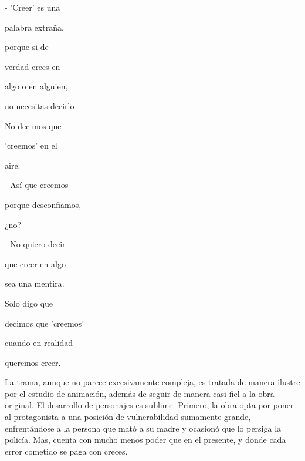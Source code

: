 \documentclass[A5paper, 11pt]{article}
\begin{document}
{\tiny{\hspace{-3.5cm}- 'Creer' es una

\hspace{-3.5cm} palabra extraña,

\hspace{-3.5cm} porque si de

\hspace{-3.5cm} verdad crees en

\hspace{-3.5cm }algo o en alguien,

\hspace{-3.5cm} no necesitas decirlo

\hspace{-3.5cm} No decimos que

\hspace{-3.5cm} 'creemos' en el

\hspace{-3.5cm} aire.


\hspace{-3.5cm} - Así que creemos

\hspace{-3.5cm} porque desconfiamos,

\hspace{-3.5cm}  ¿no?

\hspace{-3.5cm} - No quiero decir

\hspace{-3.5cm} que creer en algo

\hspace{-3.5cm} sea una mentira.

\hspace{-3.5cm} Solo digo que

\hspace{-3.5cm} decimos que 'creemos'

\hspace{-3.5cm} cuando en realidad

\hspace{-3.5cm} queremos creer.}}

La trama, aunque no parece excesivamente compleja, es tratada de manera ilustre por el estudio de animaci\'on, adem\'as de seguir de manera casi fiel a la obra original. El desarrollo de personajes es sublime. Primero, la obra opta por poner al protagonista a una posici\'on de vulnerabilidad sumamente grande, enfrent\'andose a la persona que mat\'o a su madre y ocasion\'o que lo persiga la polic\'ia. Mas, cuenta con mucho menos poder que en el presente, y donde cada error cometido se paga con creces.
\end{document}
